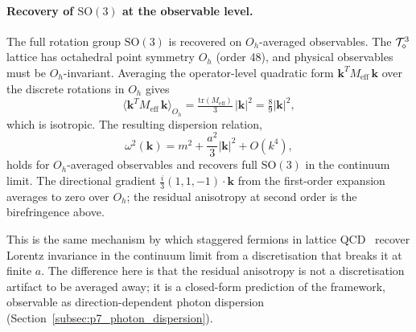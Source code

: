 \paragraph{Recovery of $\mathrm{SO}(3)$ at the observable level.}
The full rotation group $\mathrm{SO}(3)$ is recovered on
$O_h$-averaged observables.  The $\mathcal{T}_\diamond^3$ lattice has octahedral
point symmetry $O_h$ (order 48), and physical observables must be
$O_h$-invariant.  Averaging the operator-level quadratic form
$\mathbf{k}^T M_\text{eff}\,\mathbf{k}$ over the discrete rotations
in $O_h$ gives
\begin{equation}
    \langle \mathbf{k}^T M_\text{eff}\,\mathbf{k}\rangle_{O_h}
        = \tfrac{\mathrm{tr}(M_\text{eff})}{3}\,|\mathbf{k}|^2
        = \tfrac{8}{9}|\mathbf{k}|^2,
\end{equation}
which is isotropic.  The resulting dispersion relation,
\begin{equation}
    \omega^2(\mathbf{k}) = m^2 + \frac{a^2}{3}|\mathbf{k}|^2 + O(k^4),
    \label{eq:dispersion}
\end{equation}
holds for $O_h$-averaged observables and recovers full $\mathrm{SO}(3)$
in the continuum limit.  The directional gradient
$\tfrac{i}{3}(1,1,-1)\cdot\mathbf{k}$ from the first-order expansion
averages to zero over $O_h$; the residual anisotropy at second order
is the birefringence above.

This is the same mechanism by which staggered fermions in lattice
QCD~\cite{susskind1977,kogutsusskind1975} recover Lorentz invariance
in the continuum limit from a discretisation that breaks it at finite
$a$.  The difference here is that the residual anisotropy is not a
discretisation artifact to be averaged away; it is a closed-form
prediction of the framework, observable as direction-dependent photon
dispersion (Section~\ref{subsec:p7_photon_dispersion}).

